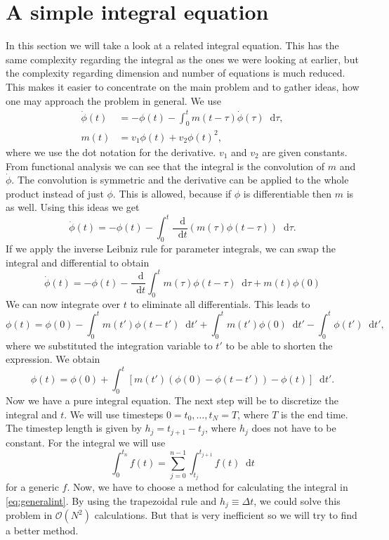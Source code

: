 \documentclass[12pt,a4paper,twoside, open=right]{scrreprt}
\theoremstyle{definition}
\theoremstyle{plain}
\newcommand{\D}{\mathop{}\!\mathrm{d}}
\begin{document}
\section{A simple integral equation}
In this section we will take a look at a related integral equation. This has the same complexity regarding the integral as the ones we were looking at earlier, but the complexity regarding dimension and number of equations is much reduced. This makes it easier to concentrate on the main problem and to gather ideas, how one may approach the problem in general. We use 
\begin{align}
   \dot\phi(t)&=-\phi(t)-\int_0^tm(t-\tau)\dot\phi(\tau)\D\tau,\\
   m(t)&=v_1\phi(t)+v_2\phi(t)^2,
\end{align}
where we use the dot notation for the derivative. $v_1$ and $v_2$ are given constants.
From functional analysis we can see that the integral is the convolution of $m$ and $\dot\phi$. The convolution is symmetric and the derivative can be applied to the whole product instead of just $\phi$. This is allowed, because if $\phi$ is differentiable then $m$ is as well. Using this ideas we get
\begin{equation}
    \dot\phi(t)=-\phi(t)-\int_0^t\frac{\D}{\D t}(m(\tau)\phi(t-\tau))\D\tau.
\end{equation}
If we apply the inverse Leibniz rule for parameter integrals, we can swap the integral and differential to obtain
\begin{equation}
    \dot\phi(t)=-\phi(t) -\frac{\D}{\D t}\int_0^t m(\tau)\phi(t-\tau)\D\tau +m(t)\phi(0)
\end{equation}
We can now integrate over $t$ to eliminate all differentials. This leads to 
\begin{equation}
    \phi(t)=\phi(0)-\int_0^tm(t')\phi(t-t')\D t' +\int_0^tm(t')\phi(0)\D t' -\int_0^t\phi(t')\D t',
\end{equation}
where we substituted the integration variable to $t'$ to be able to shorten the expression. We obtain
\begin{equation}
    \phi(t)=\phi(0)+\int_0^t[m(t')(\phi(0)-\phi(t-t'))-\phi(t)]\D t'.\label{eq:phianalytic}
\end{equation}
Now we have a pure integral equation. The next step will be to discretize the integral and $t$.
We will use timesteps $0=t_0,\dotsc,t_N=T$, where $T$ is the end time. The timestep length is given by $h_j=t_{j+1}-t_j$, where $h_j$ does not have to be constant. For the integral we will use 
\begin{equation}
    \int_0^{t_n}f(t)=\sum_{j=0}^{n-1}\int_{t_j}^{t_{j+1}}f(t)\D t\label{eq:generalint}
\end{equation}
for a generic $f$. Now, we have to choose a method for calculating the integral in \eqref{eq:generalint}. By using the trapezoidal rule and $h_j\equiv \Delta t$, we could solve this problem in $\mathcal{O}(N^2)$ calculations. But that is very inefficient so we will try to find a better method.
\end{document}
